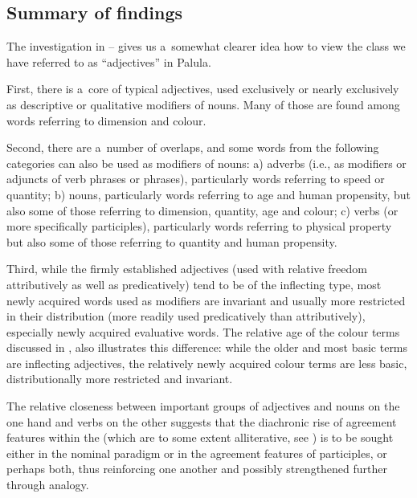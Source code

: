 \subsection{Summary of findings}
\label{subsec:6-2-9}

The investigation in -- gives us a~somewhat clearer idea how to view the class we have referred to as ``adjectives'' in Palula. 



First, there is a~core of typical adjectives, used exclusively or nearly exclusively as descriptive or qualitative modifiers of nouns. Many of those are found among words referring to dimension and colour. 


\largerpage
Second, there are a~number of overlaps, and some words from the following categories can also be used as modifiers of nouns: a) adverbs (i.e., as modifiers or adjuncts of verb phrases or  phrases), particularly words referring to speed or quantity; b) nouns, particularly words referring to age and human propensity, but also some of those referring to dimension, quantity, age and colour; c) verbs (or more specifically participles), particularly words referring to physical property but also some of those referring to quantity and human propensity.



Third, while the firmly established adjectives (used with relative freedom attributively as well as predicatively) tend to be of the inflecting type, most newly acquired words used as  modifiers are invariant and usually more restricted in their distribution (more readily used predicatively than attributively), especially newly acquired evaluative words. The relative age of the colour terms discussed in , also illustrates this difference: while the older and most basic terms are inflecting adjectives, the relatively newly acquired colour terms are less basic, distributionally more restricted and invariant.



The relative closeness between important groups of adjectives and nouns on the one hand and verbs on the other suggests that the diachronic rise of agreement features within the   (which are to some extent alliterative, see \citealt[87]{corbett2006}) is to be sought either in the nominal paradigm or in the agreement features of participles, or perhaps both, thus reinforcing one another and possibly strengthened further through analogy.


